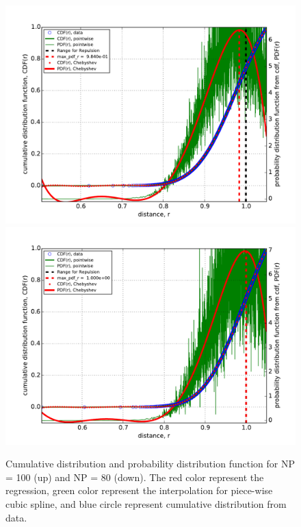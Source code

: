 \message{ !name(brief_Brownian_dynamics.tex)}\documentclass[10pt, a4paper]{report}
\begin{document}
\begin{figure}
  \centering
  \includegraphics[width=\textwidth]{figures/100_K8.pdf}
  \includegraphics[width=\textwidth]{figures/80_K8.pdf}
  \caption{Cumulative distribution and probability distribution function for NP = 100 (up) and NP = 80 (down). The red color represent the regression, green color represent the interpolation for piece-wise cubic spline, and blue circle represent cumulative distribution from data.}\label{fig:CDF_PDF_repulsion}
\end{figure}
\end{document}
